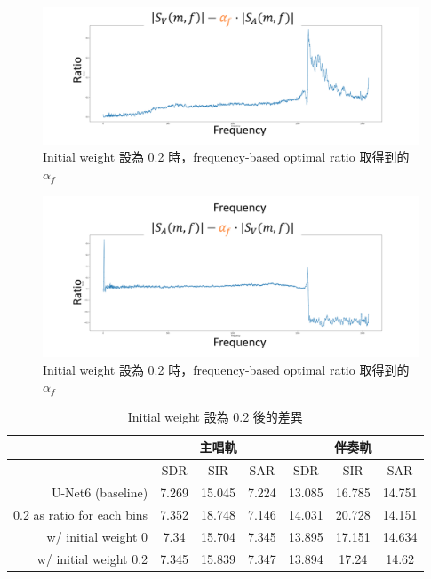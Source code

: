 \begin{figure}[htbp]
    \hfil
    \begin{minipage}[t]{0.6\textwidth}
        \includegraphics[width=\textwidth]{./figures/chapter05_result/init0.2_spectrogram_subtraction_nn_accompaniment-vocals_T-216.png}
        \caption {Initial weight 設為 0.2 時，frequency-based optimal ratio 取得到的 $\alpha_f$}
        \label{magnitude_subtraction_method2_result3}
    \end{minipage}
    \hfil
\end{figure}
\begin{figure}[htbp]
    \hfil
    \begin{minipage}[t]{0.6\textwidth}
        \includegraphics[width=\textwidth]{./figures/chapter05_result/init0.2_spectrogram_subtraction_nn_vocals-accompaniment_T-216.png}
        \caption {Initial weight 設為 0.2 時，frequency-based optimal ratio 取得到的 $\alpha_f$}
        \label{magnitude_subtraction_method2_result4}
    \end{minipage}
    \hfil
\end{figure}

\begin{table}[htbp]
\centering
\begin{tabular}{|r|c|c|c|c|c|c|}
\hline
\multicolumn{1}{|l|}{} & \multicolumn{3}{c|}{主唱軌} & \multicolumn{3}{c|}{伴奏軌} \\ \hline
\multicolumn{1}{|l|}{} & SDR & SIR & SAR & SDR & SIR & SAR \\ \hline
U-Net6 (baseline) & 7.269 & 15.045 & 7.224 & 13.085 & 16.785 & 14.751 \\ \hline
0.2 as ratio for each bins & 7.352 & 18.748 & 7.146 & 14.031 & 20.728 & 14.151 \\ \hline
w/ initial weight 0 & 7.34 & 15.704 & 7.345 & 13.895 & 17.151 & 14.634 \\ \hline
w/ initial weight 0.2 & 7.345 & 15.839 & 7.347 & 13.894 & 17.24 & 14.62 \\ \hline
\end{tabular}
\caption{Initial weight 設為 0.2 後的差異}
\label{frequency-based_init_weight_table}
\end{table}

